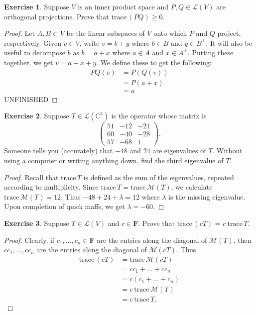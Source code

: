 \documentclass{article}
\theoremstyle{definition}
\newtheorem{ex}{Exercise}
\begin{document}
\begin{ex}
	Suppose $V$ is an inner product space and $P, Q \in \mathcal{L}(V)$ are orthogonal projections.
	Prove that $\mathrm{trace}\,(PQ) \geq 0$.
\end{ex}
\begin{proof}
	Let $A, B \subset V$ be the linear subspaces of $V$ onto which $P$ and $Q$ project, respectively.
	Given $v \in V$, write $v = b + y$ where $b \in B$ and $y \in B^\perp$.
	It will also be useful to decompose $b$ as $b = a + x$ where $a \in A$ and $x \in A^\perp$.
	Putting these together, we get $v = a + x + y$.
	We define these to get the following: \begin{align*}
		PQ(v) & = P(Q(v))  \\
		      & = P(a + x) \\
		      & = a
	\end{align*}
	UNFINISHED
\end{proof}

\begin{ex}
	Suppose $T \in \mathcal{L}(\mathbb{C}^3)$ is the operator whose matrix is \begin{equation*}
		\begin{pmatrix}
			51 & -12 & -21 \\
			60 & -40 & -28 \\
			57 & -68 & 1
		\end{pmatrix}.
	\end{equation*}
	Someone tells you (accurately) that $-48$ and $24$ are eigenvalues of $T$.
	Without using a computer or writing anything down, find the third eigenvalue of $T$.
\end{ex}
\begin{proof}
	Recall that $\mathrm{trace}\,T$ is defined as the sum of the eigenvalues, repeated according to multiplicity.
	Since $\mathrm{trace}\,T = \mathrm{trace}\,\mathcal{M}(T)$, we calculate $\mathrm{trace}\,\mathcal{M}(T) = 12$.
	Thus $-48 + 24 + \lambda = 12$ where $\lambda$ is the missing eigenvalue.
	Upon completion of quick maffs, we get $\lambda = -60$.
\end{proof}

\begin{ex}
	Suppose $T \in \mathcal{L}(V)$ and $c \in \mathbf{F}$.
	Prove that $\mathrm{trace}\,(cT)$ = $c\ \mathrm{trace}\,T$.
\end{ex}
\begin{proof}
	Clearly, if $c_1, \dots, c_n \in \mathbf{F}$ are the entries along the diagonal of $\mathcal{M}(T)$, then $cc_1, \dots, cc_n$ are the entries along the diagonal of $\mathcal{M}(cT)$.
	Thus \begin{align*}
		\mathrm{trace}\,(cT) & = \mathrm{trace}\,\mathcal{M}(cT)   \\
		                     & = cc_1 + \dots + cc_n               \\
		                     & = c(c_1 + \dots + c_n)              \\
		                     & = c\ \mathrm{trace}\,\mathcal{M}(T) \\
		                     & = c\ \mathrm{trace}\,T.
	\end{align*}
\end{proof}
\end{document}
